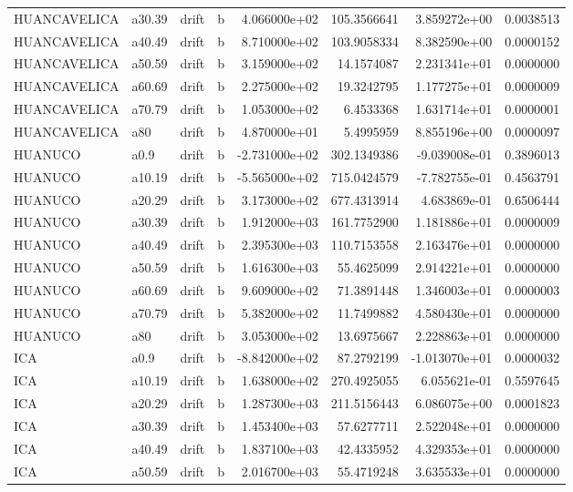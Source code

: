 \documentclass[
]{article}
\begin{document}
\begin{table}[!h]
\begin{tabular}[t]{llllrrrr}
HUANCAVELICA & a30.39 & drift & b & 4.066000e+02 & 105.3566641 & 3.859272e+00 & 0.0038513\\
\addlinespace
HUANCAVELICA & a40.49 & drift & b & 8.710000e+02 & 103.9058334 & 8.382590e+00 & 0.0000152\\
HUANCAVELICA & a50.59 & drift & b & 3.159000e+02 & 14.1574087 & 2.231341e+01 & 0.0000000\\
HUANCAVELICA & a60.69 & drift & b & 2.275000e+02 & 19.3242795 & 1.177275e+01 & 0.0000009\\
HUANCAVELICA & a70.79 & drift & b & 1.053000e+02 & 6.4533368 & 1.631714e+01 & 0.0000001\\
HUANCAVELICA & a80 & drift & b & 4.870000e+01 & 5.4995959 & 8.855196e+00 & 0.0000097\\
\addlinespace
HUANUCO & a0.9 & drift & b & -2.731000e+02 & 302.1349386 & -9.039008e-01 & 0.3896013\\
HUANUCO & a10.19 & drift & b & -5.565000e+02 & 715.0424579 & -7.782755e-01 & 0.4563791\\
HUANUCO & a20.29 & drift & b & 3.173000e+02 & 677.4313914 & 4.683869e-01 & 0.6506444\\
HUANUCO & a30.39 & drift & b & 1.912000e+03 & 161.7752900 & 1.181886e+01 & 0.0000009\\
HUANUCO & a40.49 & drift & b & 2.395300e+03 & 110.7153558 & 2.163476e+01 & 0.0000000\\
\addlinespace
HUANUCO & a50.59 & drift & b & 1.616300e+03 & 55.4625099 & 2.914221e+01 & 0.0000000\\
HUANUCO & a60.69 & drift & b & 9.609000e+02 & 71.3891448 & 1.346003e+01 & 0.0000003\\
HUANUCO & a70.79 & drift & b & 5.382000e+02 & 11.7499882 & 4.580430e+01 & 0.0000000\\
HUANUCO & a80 & drift & b & 3.053000e+02 & 13.6975667 & 2.228863e+01 & 0.0000000\\
ICA & a0.9 & drift & b & -8.842000e+02 & 87.2792199 & -1.013070e+01 & 0.0000032\\
\addlinespace
ICA & a10.19 & drift & b & 1.638000e+02 & 270.4925055 & 6.055621e-01 & 0.5597645\\
ICA & a20.29 & drift & b & 1.287300e+03 & 211.5156443 & 6.086075e+00 & 0.0001823\\
ICA & a30.39 & drift & b & 1.453400e+03 & 57.6277711 & 2.522048e+01 & 0.0000000\\
ICA & a40.49 & drift & b & 1.837100e+03 & 42.4335952 & 4.329353e+01 & 0.0000000\\
ICA & a50.59 & drift & b & 2.016700e+03 & 55.4719248 & 3.635533e+01 & 0.0000000\\

\end{tabular}
\end{table}
\end{document}
